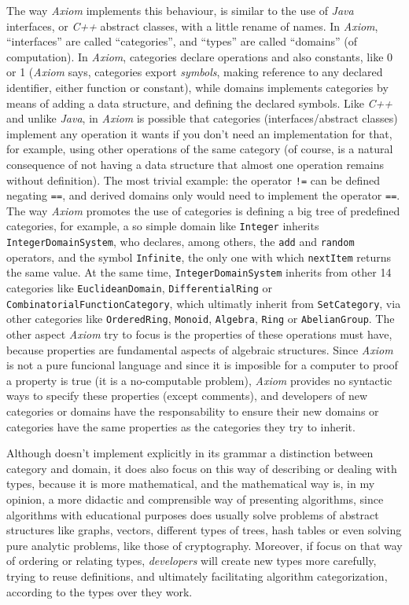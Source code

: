 \documentclass{article}
\begin{document}
The way \textit{Axiom} implements this behaviour, is similar to the use of
\textit{Java} interfaces, or \textit{C++} abstract classes, with a little rename
of names. In \textit{Axiom}, ``interfaces'' are called ``categories'', and
``types'' are called ``domains'' (of computation). In \textit{Axiom}, categories
declare operations and also constants, like 0 or 1 (\textit{Axiom} says,
categories export \textit{symbols}, making reference to any declared identifier,
either function or constant), while domains implements categories by means of
adding a data structure, and defining the declared symbols. Like \textit{C++}
and unlike \textit{Java}, in \textit{Axiom} is possible that categories
(interfaces/abstract classes) implement any operation it wants if you don't need
an implementation for that, for example, using other operations of the same
category (of course, is a natural consequence of not having a data structure
that almost one operation remains without definition). The most trivial example:
the operator \texttt{!=} can be defined negating \texttt{==}, and derived
domains only would need to implement the operator \texttt{==}. The way
\textit{Axiom} promotes the use of categories is defining a big tree of
predefined categories, for example, a so simple domain like \texttt{Integer}
inherits \texttt{IntegerDomainSystem}, who declares, among others, the
\texttt{add} and \texttt{random} operators, and the symbol \texttt{Infinite},
the only one with which \texttt{nextItem} returns the same value. At the same
time, \texttt{IntegerDomainSystem} inherits from other 14 categories like
\texttt{EuclideanDomain}, \texttt{DifferentialRing} or
\texttt{CombinatorialFunctionCategory}, which ultimatly inherit from
\texttt{SetCategory}, via other categories like \texttt{OrderedRing},
\texttt{Monoid}, \texttt{Algebra}, \texttt{Ring} or \texttt{AbelianGroup}. The
other aspect \textit{Axiom} try to focus is the properties of these operations
must have, because properties are fundamental aspects of algebraic
structures. Since \textit{Axiom} is not a pure funcional language and since it
is imposible for a computer to proof a property is true (it is a no-computable
problem), \textit{Axiom} provides no syntactic ways to specify these properties
(except comments), and developers of new categories or domains have the
responsability to ensure their new domains or categories have the same
properties as the categories they try to inherit.

Although \faupp doesn't implement explicitly in its grammar a distinction
between category and domain, it does also focus on this way of describing or
dealing with types, because it is more mathematical, and the mathematical way
is, in my opinion, a more didactic and comprensible way of presenting
algorithms, since algorithms with educational purposes does usually solve
problems of abstract structures like graphs, vectors, different types of trees,
hash tables or even solving pure analytic problems, like those of
cryptography. Moreover, if \faupp focus on that way of ordering or
relating types, \textit{developers} will create new types more carefully, trying
to reuse definitions, and ultimately facilitating algorithm categorization,
according to the types over they work.
\end{document}
